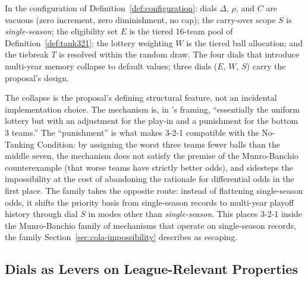 In the configuration of Definition~\ref{def:configuration}: dials $\Delta$, $\rho$, and $C$ are vacuous (zero increment, zero diminishment, no cap); the carry-over scope $S$ is \emph{single-season}; the eligibility set $E$ is the tiered 16-team pool of Definition~\ref{def:tank321}; the lottery weighting $W$ is the tiered ball allocation; and the tiebreak $T$ is resolved within the random draw. The four \cola{} dials that introduce multi-year memory collapse to default values; three dials ($E$, $W$, $S$) carry the proposal's design.

The collapse is the proposal's defining structural feature, not an incidental implementation choice. The mechanism is, in \citet{highley2026threetwoone}'s framing, ``essentially the uniform lottery but with an adjustment for the play-in and a punishment for the bottom 3 teams.'' The ``punishment'' is what makes 3-2-1 compatible with the No-Tanking Condition: by assigning the worst three teams fewer balls than the middle seven, the mechanism does not satisfy the premise of the Munro-Banchio counterexample (that worse teams have strictly better odds), and sidesteps the impossibility at the cost of abandoning the rationale for differential odds in the first place. The \cola{} family takes the opposite route: instead of flattening single-season odds, it shifts the priority basis from single-season records to multi-year playoff history through dial $S$ in modes other than \emph{single-season}. This places 3-2-1 inside the Munro-Banchio family of mechanisms that operate on single-season records, the family Section~\ref{sec:cola-impossibility} describes \cola{} as escaping.


\subsection{Dials as Levers on League-Relevant Properties}
\label{sec:dial-properties}

